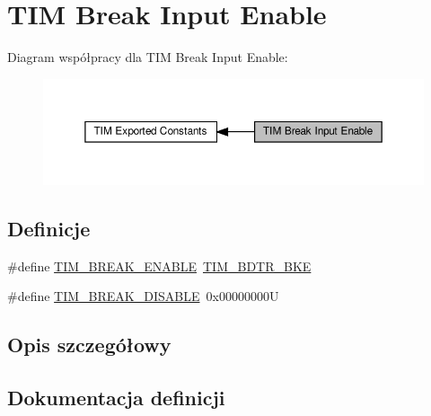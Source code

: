 \hypertarget{group___t_i_m___break___input__enable__disable}{}\section{T\+IM Break Input Enable}
\label{group___t_i_m___break___input__enable__disable}
Diagram współpracy dla T\+IM Break Input Enable\+:\nopagebreak
\begin{figure}[H]
\begin{center}
\leavevmode
\includegraphics[width=350pt]{group___t_i_m___break___input__enable__disable}
\end{center}
\end{figure}
\subsection*{Definicje}
\begin{DoxyCompactItemize}
\item 
\#define \hyperlink{group___t_i_m___break___input__enable__disable_ga3f966247b03532b8d93f9bddc032d863}{T\+I\+M\+\_\+\+B\+R\+E\+A\+K\+\_\+\+E\+N\+A\+B\+LE}~\hyperlink{group___peripheral___registers___bits___definition_ga74250b040dd9fd9c09dcc54cdd6d86d8}{T\+I\+M\+\_\+\+B\+D\+T\+R\+\_\+\+B\+KE}
\item 
\#define \hyperlink{group___t_i_m___break___input__enable__disable_ga8b34ce60f3f08c4b0d924a6546939994}{T\+I\+M\+\_\+\+B\+R\+E\+A\+K\+\_\+\+D\+I\+S\+A\+B\+LE}~0x00000000U
\end{DoxyCompactItemize}


\subsection{Opis szczegółowy}


\subsection{Dokumentacja definicji}
\mbox{\label{group___t_i_m___break___input__enable__disable_ga8b34ce60f3f08c4b0d924a6546939994}} 
